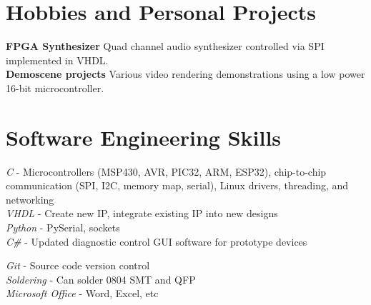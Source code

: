 \documentclass[10pt]{article} %
\begin{document}

\section {Hobbies and Personal Projects}

\textbf{FPGA Synthesizer} Quad channel audio synthesizer controlled via SPI implemented in VHDL.\\
\smallskip
\textbf{Demoscene projects} Various video rendering demonstrations using a low power 16-bit microcontroller.




\section{Software Engineering Skills}

{
  \textit{C} - Microcontrollers (MSP430, AVR, PIC32, ARM, ESP32), chip-to-chip communication (SPI, I2C, memory map, serial), Linux drivers, threading, and networking\\
\textit{VHDL} - Create new IP, integrate existing IP into new designs\\
\textit{Python} - PySerial, sockets\\
\textit{C\#} - Updated diagnostic control GUI software for prototype devices
}


{
\textit{Git} - Source code version control\\
\textit{Soldering} - Can solder 0804 SMT and QFP\\
\textit{Microsoft Office} - Word, Excel, etc
}
\end{document}
